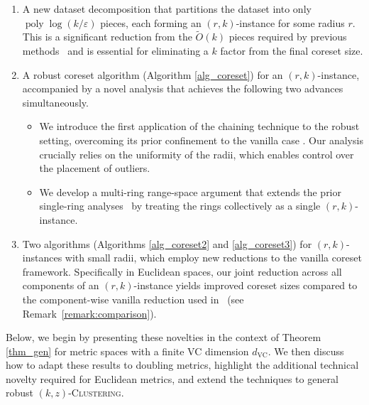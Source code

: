 \documentclass[11pt,letterpaper]{article}
\theoremstyle{definition}
\newcommand{\eps}{\varepsilon}
\newcommand{\VC}{\ensuremath{\mathrm{VC}}}
\newcommand{\ProblemName}[1]{\textsc{#1}}
\newcommand{\kzC}{\ProblemName{$(k, z)$-Clustering}\xspace}
\DeclareMathOperator{\poly}{poly}
\begin{document}
\begin{enumerate}[label=(\roman*),nosep,leftmargin=*]
	\item A new dataset decomposition that partitions the dataset into only \(\poly\!\log (k/\eps)\) pieces, each forming an \((r,k)\)-instance for some radius \(r\).  
    This is a significant reduction from the $\tilde{O}(k)$ pieces required by previous methods~\cite{huang2022near,huang2025coresets} and is  
    essential for eliminating a $k$ factor from the final coreset size.
	
	\item A robust coreset algorithm (Algorithm \ref{alg_coreset}) for an \((r,k)\)-instance, accompanied by a novel analysis that achieves the following two advances simultaneously.
    \begin{itemize}[nosep,leftmargin=*]
        \item We introduce the first application of the chaining technique to the robust setting, overcoming its prior confinement to the vanilla case \cite{bansal2024sensitivity,Cohen25}. Our analysis crucially relies on the uniformity of the radii, which enables control over the placement of outliers. 
        \item We develop a multi-ring range-space argument that extends the prior single-ring analyses~\cite{huang2022near,huang2025coresets} by treating the rings collectively as a single \((r,k)\)-instance. 
    \end{itemize}
    
	\item Two algorithms (Algorithms \ref{alg_coreset2} and \ref{alg_coreset3}) for \((r,k)\)-instances with small radii, which employ new reductions to the vanilla coreset framework. 
	Specifically in Euclidean spaces, our joint reduction across all components of an \((r,k)\)-instance yields improved coreset sizes compared to the component-wise vanilla reduction used in~\cite{jiang2025coresets} (see Remark~\ref{remark:comparison}).

\end{enumerate}

Below, we begin by presenting these novelties in the context of Theorem \ref{thm_gen} for metric spaces with a finite VC dimension \(d_{\VC}\). 
%
We then discuss how to adapt these results to doubling metrics, highlight the additional technical novelty required for Euclidean metrics, and extend the techniques to general robust \kzC.
\end{document}
